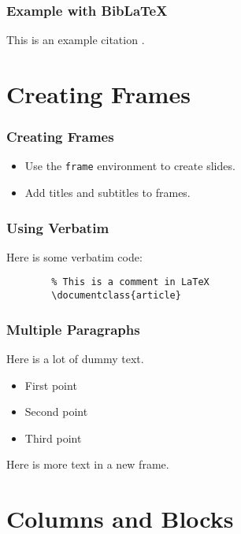 \documentclass[12pt, aspectratio=169]{beamer}
\begin{document}
\begin{frame}
    \frametitle{Example with BibLaTeX}
    This is an example citation \cite{example1}.
    
    \printbibliography %
\end{frame}

\section{Creating Frames}

\begin{frame}
    \frametitle{Creating Frames}
    \begin{itemize}
        \item Use the \texttt{frame} environment to create slides.
        \item Add titles and subtitles to frames.
    \end{itemize}
\end{frame}

\begin{frame}[fragile]
    \frametitle{Using Verbatim}
    Here is some verbatim code:
    \begin{verbatim}
        % This is a comment in LaTeX
        \documentclass{article}
    \end{verbatim}
\end{frame}

\begin{frame}[allowframebreaks]
    \frametitle{Multiple Paragraphs}
    Here is a lot of dummy text. 

    \begin{itemize}
        \item First point
        \item Second point
        \item Third point
    \end{itemize}

    \framebreak

    Here is more text in a new frame.
\end{frame}

\section{Columns and Blocks}
\end{document}
